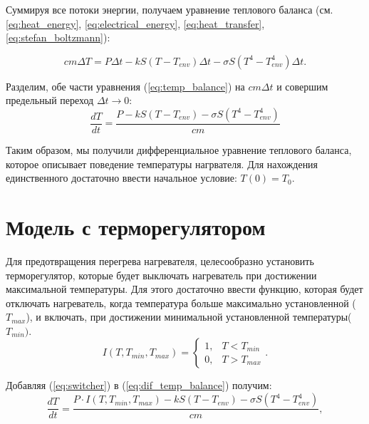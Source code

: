 Суммируя все потоки энергии, получаем уравнение теплового баланса (см. \ref{eq:heat_energy}, \ref{eq:electrical_energy}, \ref{eq:heat_transfer}, \ref{eq:stefan_boltzmann}):
 
 \begin{equation}
 	cm\Delta T = P\Delta t - k S (T-T_{env})\Delta t - \sigma S (T^4 - T^4_{env})\Delta t .
 	\label{eq:temp_balance}
 \end{equation}
 
 Разделим, обе части уравнения (\ref{eq:temp_balance}) на $cm\Delta t$ и совершим предельный переход $\Delta t \rightarrow 0$:
 \begin{equation}
 	\frac{dT}{dt} = \frac{P - kS(T-T_{env}) - \sigma S (T^4 - T^4_{env})}{cm}
 	\label{eq:dif_temp_balance}
 \end{equation}
 
 Таким образом, мы получили дифференциальное уравнение теплового баланса, которое описывает поведение температуры нагрвателя. 
 Для нахождения единственного достаточно ввести начальное условие: $T(0) = T_0$.
 \section{Модель с терморегулятором}
 
 Для предотвращения перегрева нагревателя, целесообразно установить терморегулятор, которые будет выключать нагреватель при достижении максимальной температуры. 
 Для этого достаточно ввести функцию, которая будет отключать нагреватель, когда температура больше максимально установленной ($T_{max}$), и включать, при достижении минимальной установленной температуры($T_{min})$.
 \begin{equation}
 	I(T, T_{min}, T_{max}) = 
 	\begin{cases}
 		1, & T < T_{min} \\
 		0, & T > T_{max}
 	\end{cases}.
 	\label{eq:switcher}
 \end{equation}
 
 Добавляя (\ref{eq:switcher}) в (\ref{eq:dif_temp_balance}) получим:
  \begin{equation}
 	\frac{dT}{dt} = \frac{P\cdot I(T, T_{min}, T_{max}) - kS(T-T_{env}) - \sigma S (T^4 - T^4_{env})}{cm}
 	\label{eq:dif_temp_balance_with_switcher},
 \end{equation}

 
 
 
